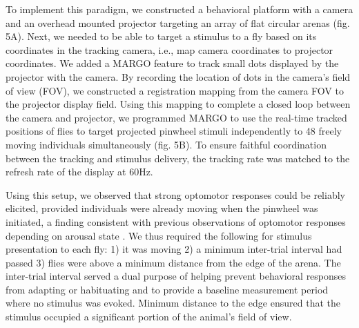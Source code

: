 \documentclass[10pt]{article}
\begin{document}
\begin{multicols}{2}
To implement this paradigm, we constructed a behavioral platform with a camera and an overhead mounted projector targeting an array of flat circular arenas (fig. 5A). Next, we needed to be able to target a stimulus to a fly based on its coordinates in the tracking camera, i.e., map camera coordinates to projector coordinates. We added a MARGO feature to track small dots displayed by the projector with the camera. By recording the location of dots in the camera's field of view (FOV), we constructed a registration mapping from the camera FOV to the projector display field. Using this mapping to complete a closed loop between the camera and projector, we programmed MARGO to use the real-time tracked positions of flies to target projected pinwheel stimuli independently to 48 freely moving individuals simultaneously (fig. 5B). To ensure faithful coordination between the tracking and stimulus delivery, the tracking rate was matched to the refresh rate of the display at 60Hz. 

Using this setup, we observed that strong optomotor responses could be reliably elicited, provided individuals were already moving when the pinwheel was initiated, a finding consistent with previous observations of optomotor responses depending on arousal state \cite{Zhu_Peripheral_2009,Kim_Fly_2016}. We thus required the following for stimulus presentation to each fly: 1) it was moving 2) a minimum inter-trial interval had passed 3) flies were above a minimum distance from the edge of the arena. The inter-trial interval served a dual purpose of helping prevent behavioral responses from adapting or habituating and to provide a baseline measurement period where no stimulus was evoked. Minimum distance to the edge ensured that the stimulus occupied a significant portion of the animal's field of view. 


\end{multicols}
\end{document}
